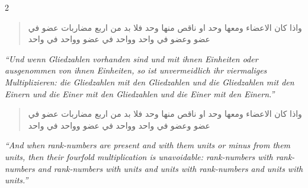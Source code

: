 \documentclass[10pt,a4paper]{article}
\newcommand{\RL}[1]{\beginR#1\endR}
\newcommand{\ar}[1]{{\arabicfont\RL{#1}}}
\newcommand{\enquote}[1]{``#1''}
\begin{document}
\begin{paracol}{2}
\switchcolumn*

\begin{quote}
\ar{واذا كان الاعضاء ومعها وحد او ناقص منها وحد فلا بد من اربع مضاربات عضو في عضو وعضو في واحد وواحد في عضو وواحد في واحد}
\end{quote}

\textit{\enquote{Und wenn Gliedzahlen vorhanden sind und mit ihnen Einheiten oder ausgenommen von ihnen Einheiten, so ist unvermeidlich ihr viermaliges Multiplizieren: die Gliedzahlen mit den Gliedzahlen und die Gliedzahlen mit den Einern und die Einer mit den Gliedzahlen und die Einer mit den Einern.}}

\switchcolumn

\begin{quote}
\ar{واذا كان الاعضاء ومعها وحد او ناقص منها وحد فلا بد من اربع مضاربات عضو في عضو وعضو في واحد وواحد في عضو وواحد في واحد}
\end{quote}

\textit{\enquote{And when rank-numbers are present and with them units or minus from them units, then their fourfold multiplication is unavoidable: rank-numbers with rank-numbers and rank-numbers with units and units with rank-numbers and units with units.}}

\end{paracol}

\clearpage
\end{document}
